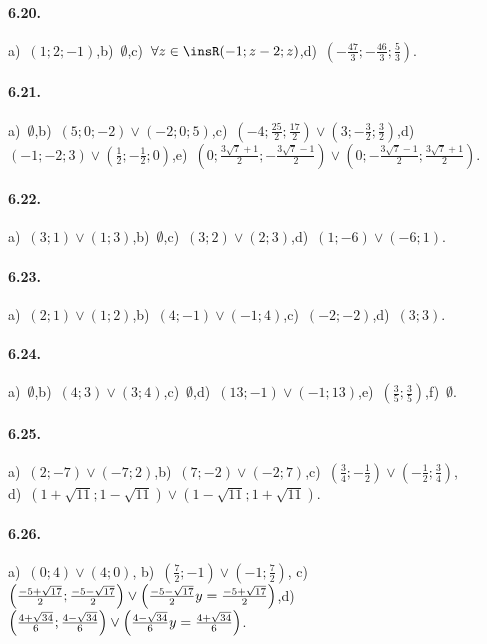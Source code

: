 \paragraph{6.20.} a)~$\left(1;2;-1\right)$,\quad b)~$\emptyset $,\quad c)~$\forall z \in \insR (-1;z-2;z)$,\quad d)~$\left(-\frac{47} 3;-\frac{46} 3;\frac 5 3\right)$.

\paragraph{6.21.} a)~$\emptyset $,\quad b)~$\left(5;0;-2\right)\vee \left(-2;0;5\right)$,\quad c)~$\left(-4;\frac{25} 2;\frac{17} 2\right)\vee \left(3;-\frac 3 2;\frac 3 2\right)$,\quad d)~$\left(-1;-2;3\right)\vee \left(\frac 1 2;-\frac 1 2;0\right)$,\quad e)~$\left(0;\frac{3\sqrt 7+1} 2;-\frac{3\sqrt 7-1} 2\right)\vee \left(0;-\frac{3\sqrt 7-1} 2;\frac{3\sqrt 7+1} 2\right)$.

\paragraph{6.22.} a)~$(3;1)\vee(1;3)$,\quad b)~$\emptyset $,\quad c)~$(3;2)\vee(2;3)$,\quad d)~$(1;-6)\vee(-6;1)$.

\paragraph{6.23.} a)~$(2;1)\vee(1;2)$,\quad b)~$(4;-1)\vee(-1;4)$,\quad c)~$(-2;-2)$,\quad d)~$(3;3)$.

\paragraph{6.24.} a)~$\emptyset $,\quad b)~$(4;3)\vee(3;4)$,\quad c)~$\emptyset $,\quad d)~$(13;-1)\vee(-1;13)$,\quad e)~$\left(\frac 3 5;\frac 3 5\right)$,\quad f)~$\emptyset $.

\paragraph{6.25.} a)~$(2;-7)\vee(-7;2)$,\quad b)~$(7;-2)\vee(-2;7)$,\quad c)~$\left(\frac 3 4;-\frac 1 2\right)\vee\left(-\frac 1 2;\frac 3 4\right)$,\protect\\
\quad d)~$\left(1+\sqrt{11};1-\sqrt{11}\right)\vee\left(1-\sqrt{11};1+\sqrt{11}\right)$.

\paragraph{6.26.} a)~$(0;4)\vee(4;0)$,\; b)~$\left(\frac 7 2;-1\right)\vee\left(-1;\frac 7 2\right)$,\; c)~$\left(\frac{-5+\sqrt{17}} 2;\frac{-5-\sqrt{17}} 2\right)\vee \left(\frac{-5-\sqrt{17}} 2\\y=\frac{-5+\sqrt{17}} 2\right)$,\quad d)~$\left(\frac{4+\sqrt{34}} 6;\frac{4-\sqrt{34}} 6\right)\vee \left(\frac{4-\sqrt{34}} 6\\y=\frac{4+\sqrt{34}} 6\right)$.

